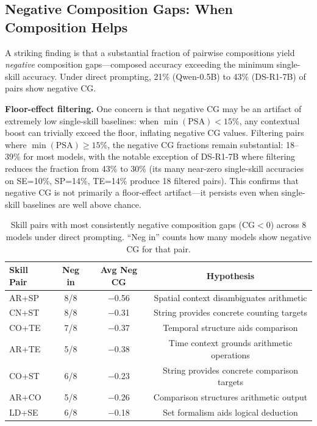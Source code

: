 \documentclass{article}
\begin{document}
\subsection{Negative Composition Gaps: When Composition Helps}
\label{sec:negative_cg}

A striking finding is that a substantial fraction of pairwise compositions yield \emph{negative} composition gaps---composed accuracy exceeding the minimum single-skill accuracy. Under direct prompting, 21\% (Qwen-0.5B) to 43\% (DS-R1-7B) of pairs show negative CG.

\textbf{Floor-effect filtering.} One concern is that negative CG may be an artifact of extremely low single-skill baselines: when $\min(\text{PSA}) < 15\%$, any contextual boost can trivially exceed the floor, inflating negative CG values. Filtering pairs where $\min(\text{PSA}) \geq 15\%$, the negative CG fractions remain substantial: 18--39\% for most models, with the notable exception of DS-R1-7B where filtering reduces the fraction from 43\% to 30\% (its many near-zero single-skill accuracies on SE=10\%, SP=14\%, TE=14\% produce 18 filtered pairs). This confirms that negative CG is not primarily a floor-effect artifact---it persists even when single-skill baselines are well above chance.

\begin{table}[t]
\centering
\caption{Skill pairs with most consistently negative composition gaps (CG$<$0) across 8 models under direct prompting. ``Neg in'' counts how many models show negative CG for that pair.}
\label{tab:negative_cg}
\begin{tabular}{lccc}
\toprule
Skill Pair & Neg in & Avg Neg CG & Hypothesis \\
\midrule
AR+SP & 8/8 & $-$0.56 & Spatial context disambiguates arithmetic \\
CN+ST & 8/8 & $-$0.31 & String provides concrete counting targets \\
CO+TE & 7/8 & $-$0.37 & Temporal structure aids comparison \\
AR+TE & 5/8 & $-$0.38 & Time context grounds arithmetic operations \\
CO+ST & 6/8 & $-$0.23 & String provides concrete comparison targets \\
AR+CO & 5/8 & $-$0.26 & Comparison structures arithmetic output \\
LD+SE & 6/8 & $-$0.18 & Set formalism aids logical deduction \\
\bottomrule
\end{tabular}
\end{table}
\end{document}
